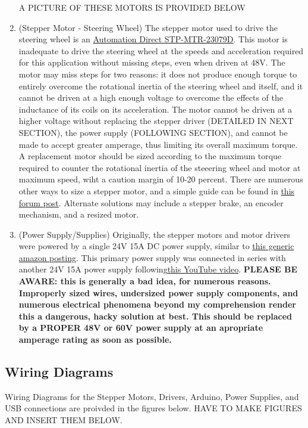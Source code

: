 \documentclass{article}
\begin{document}
\begin{enumerate}
A PICTURE OF THESE MOTORS IS PROVIDED BELOW
\item(Stepper Motor - Steering Wheel) The stepper motor used to drive the steering wheel is an \href{https://www.automationdirect.com/adc/shopping/catalog/motion_control/stepper_systems/dual_shaft_and_encoder_stepper_motors/stp-mtr-23079d}{Automation Direct STP-MTR-23079D}. This motor is inadequate to drive the steering wheel at the speeds and acceleration required for this application without missing steps, even when driven at 48V. The motor may miss steps for two reasons: it does not produce enough torque to entirely overcome the rotational inertia of the steering wheel and itself, and it cannot be driven at a high enough voltage to overcome the effects of the inductance of its coils on its acceleration. The motor cannot be driven at a higher voltage without replacing the stepper driver (DETAILED IN NEXT SECTION), the power supply (FOLLOWING SECTION), and cannot be made to accept greater amperage, thus limiting its overall maximum torque. A replacement motor should be sized according to the maximum torque required to counter the rotational inertia of the steeering wheel and motor at maximum speed, wiht a caution margin of 10-20 percent. There are numerous other ways to size a stepper motor, and a simple guide can be found in \href{https://forum.arduino.cc/t/stepper-motor-basics/275223}{this forum post}. Alternate solutions may include a stepper brake, an encoder mechanism, and a resized motor.
\item(Power Supply/Supplies) Originally, the stepper motors and motor drivers were powered by a single 24V 15A DC power supply, similar to \href{https://www.amazon.com/Switching-SJHPRMXF-Universal-Regulated-Transformer/dp/B0BWC8J2HY/ref=sr_1_4?crid=2KFHB4ZPW918C&dib=eyJ2IjoiMSJ9.FPK3xtReWIHdljtMiM5tJdXhBQ5q_-IO-pflt5CI00iFDB9iYGMc79Ty_FO0dvSjdtl0D0Zih9khd_51xjQamVo7iaApGN1fatpqVmezqN7-BDClRtcv_gsEr8ofznzE0bb5uG-HI-YOc7R0-aT_jQXBuObvvQguQbhkOHwR9Rz7JSEfk6LCDIEusBev-jj4meyV8GGQBtdx2AE4DfrnhkPKcfrdVDSSCgHEC-I6Ccjzjrr8_a77e0xSFJ9ziQedmuPHjgInys8orLajkbVt0rwaIr624xeHIuU9LhTWBNQ.29UMZP6yEU8jGo2FBFcXFL1GxivPtxQHOTDhLT26qvg&}{this generic amazon posting}. This primary power supply was connected in series with another 24V 15A power supply following\href{https://www.youtube.com/watch?v=jbzb66dCbOc}{this YouTube video}. \textbf{PLEASE BE AWARE: this is generally a bad idea, for numerous reasons. Improperly sized wires, undersized power supply components, and numerous electrical phenomena beyond my comprehension render this a dangerous, hacky solution at best. This should be replaced by a PROPER 48V or 60V power supply at an apropriate amperage rating as soon as possible.}
\end{enumerate}
\subsection{Wiring Diagrams}
Wiring Diagrams for the Stepper Motors, Drivers, Arduino, Power Supplies, and USB connections are proivded in the figures below. HAVE TO MAKE FIGURES AND INSERT THEM BELOW.
\end{document}
